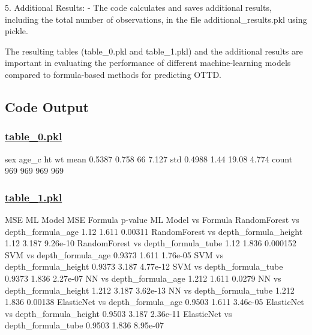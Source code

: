 \documentclass[11pt]{article}
\begin{document}
5. Additional Results:
   - The code calculates and saves additional results, including the total number of observations, in the file additional\_results.pkl using pickle.


The resulting tables (table\_0.pkl and table\_1.pkl) and the additional results are important in evaluating the performance of different machine-learning models compared to formula-based methods for predicting OTTD.

\subsection{Code Output}\hypertarget{file-table-0-pkl}{}

\subsubsection*{\hyperlink{code-Data Analysis-table-0-pkl}{table\_0.pkl}}

\begin{codeoutput}
         sex  age\_c    ht    wt
mean  0.5387  0.758    66 7.127
std   0.4988   1.44 19.08 4.774
count    969    969   969   969
\end{codeoutput}\hypertarget{file-table-1-pkl}{}

\subsubsection*{\hyperlink{code-Data Analysis-table-1-pkl}{table\_1.pkl}}

\begin{codeoutput}
                                      MSE ML Model  MSE Formula   p-value
ML Model vs Formula                                                      
RandomForest vs depth\_formula\_age             1.12        1.611   0.00311
RandomForest vs depth\_formula\_height          1.12        3.187  9.26e-10
RandomForest vs depth\_formula\_tube            1.12        1.836  0.000152
SVM vs depth\_formula\_age                    0.9373        1.611  1.76e-05
SVM vs depth\_formula\_height                 0.9373        3.187  4.77e-12
SVM vs depth\_formula\_tube                   0.9373        1.836  2.27e-07
NN vs depth\_formula\_age                      1.212        1.611    0.0279
NN vs depth\_formula\_height                   1.212        3.187  3.62e-13
NN vs depth\_formula\_tube                     1.212        1.836   0.00138
ElasticNet vs depth\_formula\_age             0.9503        1.611  3.46e-05
ElasticNet vs depth\_formula\_height          0.9503        3.187  2.36e-11
ElasticNet vs depth\_formula\_tube            0.9503        1.836  8.95e-07
\end{codeoutput}\hypertarget{file-additional-results-pkl}{}
\end{document}
